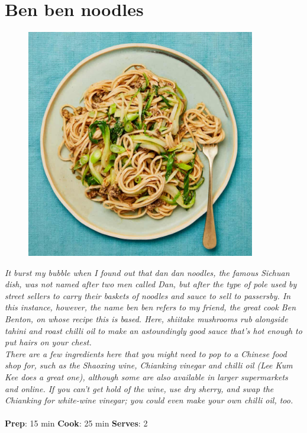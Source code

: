 \documentclass{book}
\begin{document}
\section{Ben ben noodles}
\begin{figure}
\centering\includegraphics[width=10cm,height=10cm,keepaspectratio]{Recipe_Pictures/Ben_ben_noodles.png}
\end{figure}
\emph{It burst my bubble when I found out that dan dan noodles, the famous Sichuan dish, was not named after two men called Dan, but after the type of pole used by street sellers to carry their baskets of noodles and sauce to sell to passersby. In this instance, however, the name ben ben refers to my friend, the great cook Ben Benton, on whose recipe this is based. Here, shiitake mushrooms rub alongside tahini and roast chilli oil to make an astoundingly good sauce that’s hot enough to put hairs on your chest.\\ 
There are a few ingredients here that you might need to pop to a Chinese food shop for, such as the Shaoxing wine, Chianking vinegar and chilli oil (Lee Kum Kee does a great one), although some are also available in larger supermarkets and online. If you can’t get hold of the wine, use dry sherry, and swap the Chianking for white-wine vinegar; you could even make your own chilli oil, too.}\\\\ 
\textbf{Prep}: 15 min
\textbf{Cook}: 25 min
\textbf{Serves}: 2
\end{document}
